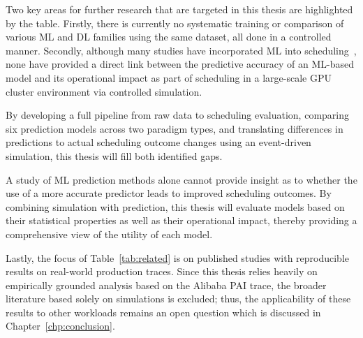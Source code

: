 Two key areas for further research that are targeted in this thesis are highlighted by the table. Firstly, there is currently no systematic training or comparison of various ML and DL families using the same dataset, all done in a controlled manner. Secondly, although many studies have incorporated ML into scheduling~\cite{cortez2017resource,mao2019learning}, none have provided a direct link between the predictive accuracy of an ML-based model and its operational impact as part of scheduling in a large-scale GPU cluster environment via controlled simulation.

By developing a full pipeline from raw data to scheduling evaluation, comparing six prediction models across two paradigm types, and translating differences in predictions to actual scheduling outcome changes using an event-driven simulation, this thesis will fill both identified gaps.

\clearpage
A study of ML prediction methods alone cannot provide insight as to whether the use of a more accurate predictor leads to improved scheduling outcomes. By combining simulation with prediction, this thesis will evaluate models based on their statistical properties as well as their operational impact, thereby providing a comprehensive view of the utility of each model.

Lastly, the focus of Table~\ref{tab:related} is on published studies with reproducible results on real-world production traces. Since this thesis relies heavily on empirically grounded analysis based on the Alibaba PAI trace, the broader literature based solely on simulations is excluded; thus, the applicability of these results to other workloads remains an open question which is discussed in Chapter~\ref{chp:conclusion}.
